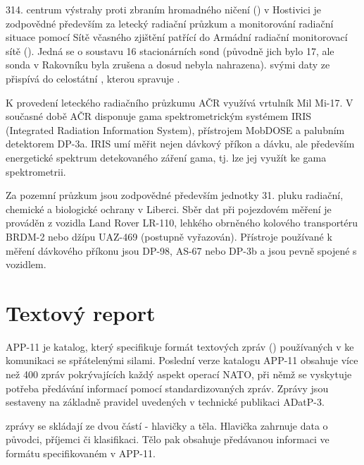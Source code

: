 	 314. centrum výstrahy proti zbraním hromadného ničení () v Hostivici je zodpovědné především za letecký radiační průzkum a monitorování radiační situace pomocí Sítě včasného zjištění patřící do Armádní radiační monitorovací sítě (). Jedná se o soustavu 16 stacionárních sond (původně jich bylo 17, ale sonda v Rakovníku byla zrušena a dosud nebyla nahrazena).  svými daty ze  přispívá do celostátní , kterou spravuje .
	 
	 K provedení leteckého radiačního průzkumu AČR využívá vrtulník Mil Mi-17. V současné době AČR disponuje gama spektrometrickým systémem IRIS (Integrated Radiation Information System), přístrojem MobDOSE a palubním detektorem DP-3a. IRIS umí měřit nejen dávkový příkon a dávku, ale především energetické spektrum detekovaného záření gama, tj. lze jej využít ke gama spektrometrii.
	
	 Za pozemní průzkum jsou zodpovědné především jednotky 31. pluku radiační, chemické a biologické ochrany v Liberci. Sběr dat při pojezdovém měření je prováděn z vozidla Land Rover LR-110, lehkého obrněného kolového transportéru BRDM-2 nebo džípu UAZ-469 (postupně vyřazován). Přístroje používané k měření dávkového příkonu jsou DP-98, AS-67 nebo DP-3b a jsou pevně spojené s vozidlem. 
	 
	 
\section{Textový report}

APP-11 je katalog, který specifikuje formát textových zpráv () používaných v  ke komunikaci se spřátelenými silami. Poslední verze katalogu APP-11 obsahuje více než 400 zpráv pokrývajících každý aspekt operací NATO, při němž se vyskytuje potřeba předávání informací pomocí standardizovaných zpráv. Zprávy jsou sestaveny na základně pravidel uvedených v technické publikaci ADatP-3. 

 zprávy se skládají ze dvou částí - hlavičky a těla. Hlavička zahrnuje data o původci, příjemci či klasifikaci. Tělo pak obsahuje předávanou informaci ve formátu specifikovaném v APP-11. 

